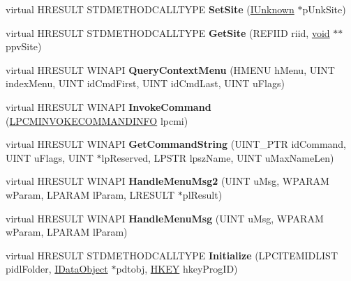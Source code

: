 \begin{DoxyCompactItemize}
\item 
\mbox{\label{class_c_new_menu_a5d604333958c65eb2022fa2d4df15219}} 
virtual H\+R\+E\+S\+U\+LT S\+T\+D\+M\+E\+T\+H\+O\+D\+C\+A\+L\+L\+T\+Y\+PE {\bfseries Set\+Site} (\hyperlink{interface_i_unknown}{I\+Unknown} $\ast$p\+Unk\+Site)
\item 
\mbox{\label{class_c_new_menu_a83ca22a84ea7c082dbc7612aa233d8e8}} 
virtual H\+R\+E\+S\+U\+LT S\+T\+D\+M\+E\+T\+H\+O\+D\+C\+A\+L\+L\+T\+Y\+PE {\bfseries Get\+Site} (R\+E\+F\+I\+ID riid, \hyperlink{interfacevoid}{void} $\ast$$\ast$ppv\+Site)
\item 
\mbox{\label{class_c_new_menu_a7536460f582d81eb7c588aa2c07da114}} 
virtual H\+R\+E\+S\+U\+LT W\+I\+N\+A\+PI {\bfseries Query\+Context\+Menu} (H\+M\+E\+NU h\+Menu, U\+I\+NT index\+Menu, U\+I\+NT id\+Cmd\+First, U\+I\+NT id\+Cmd\+Last, U\+I\+NT u\+Flags)
\item 
\mbox{\label{class_c_new_menu_a683129178e842143ed3af7a613739d16}} 
virtual H\+R\+E\+S\+U\+LT W\+I\+N\+A\+PI {\bfseries Invoke\+Command} (\hyperlink{struct_i_context_menu_1_1tag_c_m_i_n_v_o_k_e_c_o_m_m_a_n_d_i_n_f_o}{L\+P\+C\+M\+I\+N\+V\+O\+K\+E\+C\+O\+M\+M\+A\+N\+D\+I\+N\+FO} lpcmi)
\item 
\mbox{\label{class_c_new_menu_ad3a67fc69f0e6d7cced46b3bc385ea0b}} 
virtual H\+R\+E\+S\+U\+LT W\+I\+N\+A\+PI {\bfseries Get\+Command\+String} (U\+I\+N\+T\+\_\+\+P\+TR id\+Command, U\+I\+NT u\+Flags, U\+I\+NT $\ast$lp\+Reserved, L\+P\+S\+TR lpsz\+Name, U\+I\+NT u\+Max\+Name\+Len)
\item 
\mbox{\label{class_c_new_menu_ae4ce19804c3bc73a66d5ed0f66334152}} 
virtual H\+R\+E\+S\+U\+LT W\+I\+N\+A\+PI {\bfseries Handle\+Menu\+Msg2} (U\+I\+NT u\+Msg, W\+P\+A\+R\+AM w\+Param, L\+P\+A\+R\+AM l\+Param, L\+R\+E\+S\+U\+LT $\ast$pl\+Result)
\item 
\mbox{\label{class_c_new_menu_a699ebf331a420ee481d7ac382d9c35c2}} 
virtual H\+R\+E\+S\+U\+LT W\+I\+N\+A\+PI {\bfseries Handle\+Menu\+Msg} (U\+I\+NT u\+Msg, W\+P\+A\+R\+AM w\+Param, L\+P\+A\+R\+AM l\+Param)
\item 
\mbox{\label{class_c_new_menu_a0a37d5bb03554ab19cc0abd4763a7298}} 
virtual H\+R\+E\+S\+U\+LT S\+T\+D\+M\+E\+T\+H\+O\+D\+C\+A\+L\+L\+T\+Y\+PE {\bfseries Initialize} (L\+P\+C\+I\+T\+E\+M\+I\+D\+L\+I\+ST pidl\+Folder, \hyperlink{interface_i_data_object}{I\+Data\+Object} $\ast$pdtobj, \hyperlink{interfacevoid}{H\+K\+EY} hkey\+Prog\+ID)
\end{DoxyCompactItemize}
